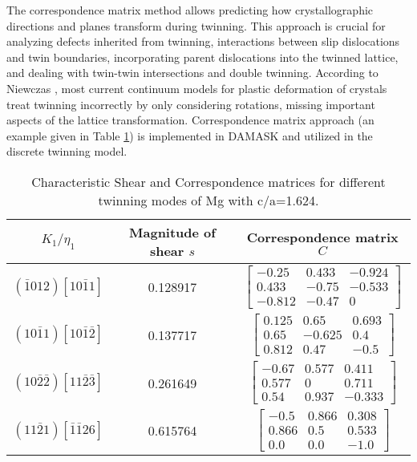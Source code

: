 The correspondence matrix method allows predicting how crystallographic directions and planes transform during twinning. This approach is crucial for analyzing defects inherited from twinning, interactions between slip dislocations and twin boundaries, incorporating parent dislocations into the twinned lattice, and dealing with twin-twin intersections and double twinning. According to Niewczas \cite{Niewczas121}, most current continuum models for plastic deformation of crystals treat twinning incorrectly by only considering rotations, missing important aspects of the lattice transformation. Correspondence matrix approach (an example given in Table \ref{tab:Shear and correspondence matrices for Mg}) is implemented in DAMASK and utilized in the discrete twinning model.

\begin{table}[H]
\centering
\caption{Characteristic Shear and Correspondence matrices for different twinning modes of Mg with c/a=1.624.}
    \begin{tabular}{ccc}
    \hline
    $K_1 / \eta_1$ & Magnitude of shear $s$ & Correspondence matrix $C$ \\
    \hline
    $( \bar{1} 0 1 2 ) [1 0 \bar{1} 1] $ & 0.128917 &  $\begin{bmatrix}  -0.25 & 0.433 & -0.924 \\ 0.433 & -0.75 & -0.533 \\  -0.812 & -0.47 & 0 \end{bmatrix}$ \\
    $( 1 0 \bar{1} 1 ) [1 0 \bar{1} \bar{2}] $ & 0.137717 & $\begin{bmatrix}  0.125 & 0.65 & 0.693 \\ 0.65 & -0.625 & 0.4 \\  0.812 & 0.47 & -0.5 \end{bmatrix}$ \\
    $( 1 0 \bar{2} \bar{2} ) [1 1 \bar{2} \bar{3}] $ & 0.261649 & $\begin{bmatrix}  -0.67 & 0.577 & 0.411 \\ 0.577 & 0 & 0.711 \\  0.54 & 0.937 & -0.333 \end{bmatrix}$ \\
    $( 1 1 \bar{2} 1) [\bar{1}\bar{1} 2 6] $ & 0.615764 & $\begin{bmatrix}  -0.5 & 0.866 & 0.308 \\ 0.866 & 0.5 & 0.533 \\  0.0 & 0.0 & -1.0 \end{bmatrix}$ \\
    \hline
    \end{tabular}

\label{tab:Shear and correspondence matrices for Mg}
\end{table}


